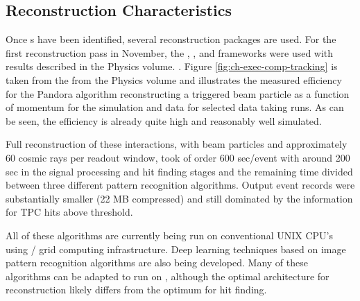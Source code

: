 \subsection{Reconstruction Characteristics}



Once s have been identified, several \threed  reconstruction packages are used. For the first reconstruction pass in November, the  \cite{Acciarri:2017hat}, \cite{wirecell}, and \cite{ref:PMA}  frameworks were used with results described in the Physics volume. .  %
Figure \ref{fig:ch-exec-comp-tracking}  is taken from the from the Physics volume and illustrates the measured efficiency for the Pandora algorithm reconstructing a triggered beam particle as a function of momentum for the simulation and data for selected data taking runs. As can be seen, the efficiency is already quite high and reasonably well simulated.




Full reconstruction of these  interactions, with beam particles and approximately 60 cosmic rays per readout window, took of order 600 sec/event with around 200 sec in the signal processing and hit finding stages and the remaining time divided between three different pattern recognition algorithms. Output event records were substantially smaller (22 MB compressed) and still dominated by the information for TPC hits above threshold. 

All of these algorithms are currently being run on conventional UNIX CPU's using / grid computing  infrastructure. Deep learning techniques based on image pattern recognition algorithms are also being developed. Many of these algorithms can be adapted to run on , although the optimal architecture for \threed reconstruction likely differs from the optimum for hit finding.


